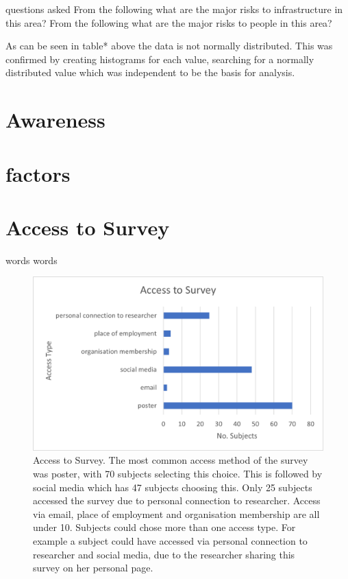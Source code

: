 questions asked From the following what are the major risks to infrastructure in this area?
From the following what are the major risks to people in this area?

As can be seen in table* above the data is not normally distributed. This was confirmed by creating histograms for each value, searching for a normally distributed value which was independent to be the basis for analysis. 

\section{Awareness}

\section{factors}

\section{Access to Survey}
words words
\begin{figure}[h]
    \centering
    \includegraphics{fig_results/access_survey.png}
    \caption{Access to Survey. The most common access method of the survey was poster, with 70 subjects selecting this choice. This is followed by social media which has 47 subjects choosing this. Only 25 subjects accessed the survey due to personal connection to researcher. Access via email, place of employment and organisation membership are all under 10. Subjects could chose more than one access type. For example a subject could have accessed via personal connection to researcher and social media, due to the researcher sharing this survey on her personal page.}
    \label{fig:access_survey}
\end{figure}

